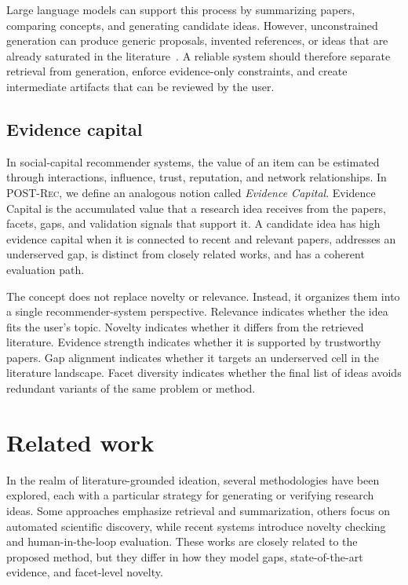 \documentclass[preprint,12pt]{elsarticle}
\begin{document}
Large language models can support this process by summarizing papers, comparing concepts, and generating candidate ideas. However, unconstrained generation can produce generic proposals, invented references, or ideas that are already saturated in the literature~\cite{lu2024aiscientist,si2025llmideas}. A reliable system should therefore separate retrieval from generation, enforce evidence-only constraints, and create intermediate artifacts that can be reviewed by the user.

\subsection{Evidence capital}

In social-capital recommender systems, the value of an item can be estimated through interactions, influence, trust, reputation, and network relationships. In \textsc{POST-Rec}, we define an analogous notion called \emph{Evidence Capital}. Evidence Capital is the accumulated value that a research idea receives from the papers, facets, gaps, and validation signals that support it. A candidate idea has high evidence capital when it is connected to recent and relevant papers, addresses an underserved gap, is distinct from closely related works, and has a coherent evaluation path.

The concept does not replace novelty or relevance. Instead, it organizes them into a single recommender-system perspective. Relevance indicates whether the idea fits the user's topic. Novelty indicates whether it differs from the retrieved literature. Evidence strength indicates whether it is supported by trustworthy papers. Gap alignment indicates whether it targets an underserved cell in the literature landscape. Facet diversity indicates whether the final list of ideas avoids redundant variants of the same problem or method.

\section{Related work}
\label{sec:related}

In the realm of literature-grounded ideation, several methodologies have been explored, each with a particular strategy for generating or verifying research ideas. Some approaches emphasize retrieval and summarization, others focus on automated scientific discovery, while recent systems introduce novelty checking and human-in-the-loop evaluation. These works are closely related to the proposed method, but they differ in how they model gaps, state-of-the-art evidence, and facet-level novelty.
\end{document}
